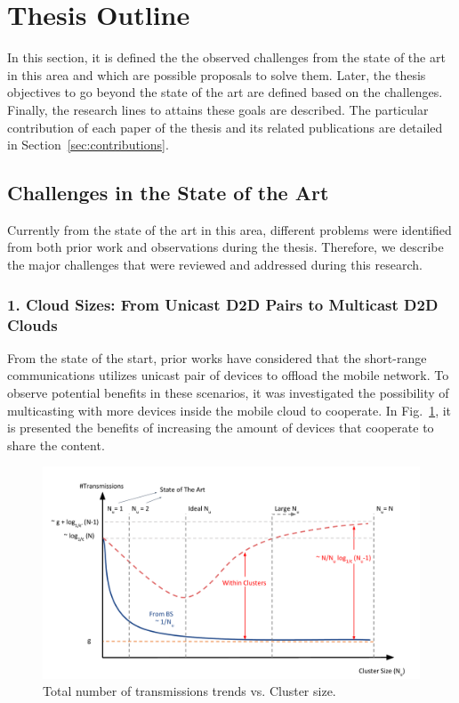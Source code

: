 \section{Thesis Outline}\label{sec:intro_thesis_outline}

In this section, it is defined the the observed challenges from the state of the art in this area and which are possible proposals to solve them. Later, the thesis objectives to go beyond the state of the art are defined based on the challenges. Finally, the research lines to attains these goals are described. The particular contribution of each paper of the thesis and its related publications are detailed in Section~\ref{sec:contributions}.

\subsection{Challenges in the State of the Art}
Currently from the state of the art in this area, different problems were identified from both prior work and observations during the thesis. Therefore, we describe the major challenges that were reviewed and addressed during this research. 

\subsubsection{1. Cloud Sizes: From Unicast D2D Pairs to Multicast D2D Clouds}
\label{sec:cloud_sizes}

From the state of the start, prior works have considered that the short-range communications utilizes unicast pair of devices to offload the mobile network. To observe potential benefits in these scenarios, it was investigated the possibility of multicasting with more devices inside the mobile cloud to cooperate. In Fig.~\ref{fig:cloud_sizes}, it is presented the benefits of increasing the amount of devices that cooperate to share the content.

\begin{figure}[h]
  \centering
  \includegraphics[width=\textwidth]{introduction/figures/cloud_sizes.pdf}
  \caption{Total number of transmissions trends vs. Cluster size.}
\label{fig:cloud_sizes}
\end{figure}

